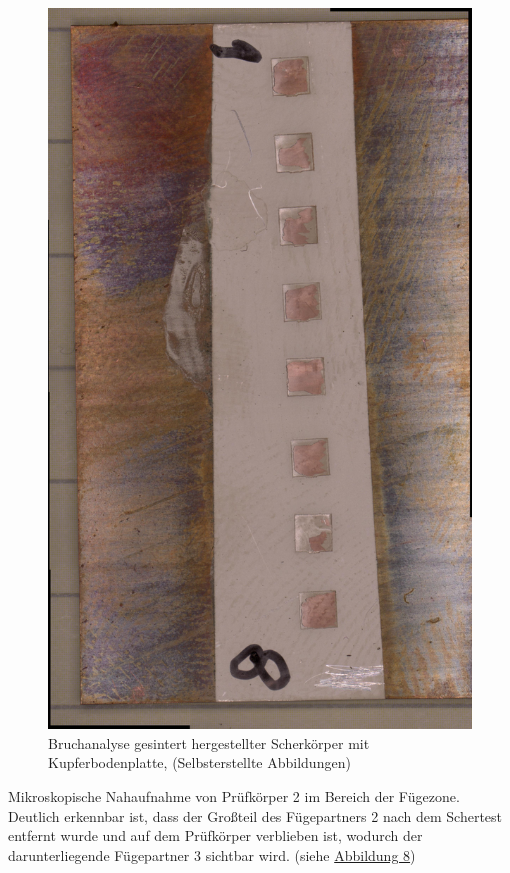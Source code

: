 \begin{figure}[H]
    \centering
    \includegraphics[scale=0.07]{Bilder/Bodenplatte_Sintern_Gesamt.jpg}
    \caption{Bruchanalyse gesintert hergestellter Scherkörper mit Kupferbodenplatte, (Selbsterstellte Abbildungen)}
    \label{sin}
\end{figure}

Mikroskopische Nahaufnahme von Prüfkörper 2 im Bereich der Fügezone. Deutlich erkennbar ist, dass der Großteil des Fügepartners 2 nach dem Schertest entfernt wurde und auf dem Prüfkörper verblieben ist, wodurch der darunterliegende Fügepartner 3 sichtbar wird. (siehe \hyperref[sin2]{Abbildung 8})

